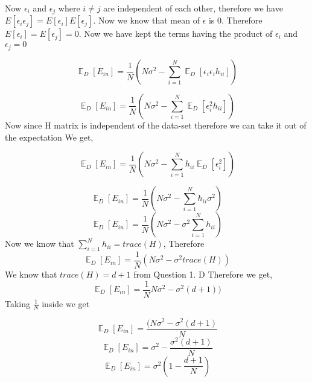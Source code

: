 \documentclass{article}
\DeclareMathOperator{\E}{\mathbb{E}}
\begin{document}
Now $\epsilon_i$ and $\epsilon_j$ where $i \neq j$ are independent of each other, therefore we have $E[\epsilon_i\epsilon_j] = E[\epsilon_i]E[\epsilon_j]$. Now we know that mean of $\epsilon$ is 0. Therefore $E[\epsilon_i] = E[\epsilon_j] = 0$. Now we have kept the terms having the product of $\epsilon_i$ and $\epsilon_j=0$ 

$$\E_{D}[E_{in}] = \frac{1}{N}(N\sigma^2- \sum_{i = 1}^{N}\E_D[\epsilon_i\epsilon_ih_{ii}])$$

$$\E_{D}[E_{in}] = \frac{1}{N}(N\sigma^2-\sum_{i = 1}^{N}\E_D[ \epsilon_i^2h_{ii}])$$
Now since H matrix is independent of the data-set therefore we can take it out of the expectation
We get, 

$$\E_{D}[E_{in}] = \frac{1}{N}(N\sigma^2-\sum_{i = 1}^{N}h_{ii}\E_D[ \epsilon_i^2])$$

$$\E_{D}[E_{in}] = \frac{1}{N}(N\sigma^2-\sum_{i = 1}^{N}h_{ii}\sigma^2)$$
$$\E_{D}[E_{in}] = \frac{1}{N}(N\sigma^2-\sigma^2\sum_{i = 1}^{N}h_{ii})$$
Now we know that $\sum_{i = 1}^{N}h_{ii}=trace(H)$, Therefore
$$\E_{D}[E_{in}] = \frac{1}{N}(N\sigma^2-\sigma^2trace(H))$$
We know that $trace(H) = d+1$ from Question 1. D
Therefore we get,
$$\E_{D}[E_{in}] = \frac{1}{N}N\sigma^2-\sigma^2(d+1))$$
Taking $\frac{1}{N} $ inside we get

$$\E_{D}[E_{in}] = \frac{(N\sigma^2-\sigma^2(d+1)}{N}$$
$$\E_{D}[E_{in}] = \sigma^2-\frac{\sigma^2(d+1)}{N}$$
$$\E_{D}[E_{in}] = \sigma^2(1-\frac{d+1}{N})$$
\end{document}
